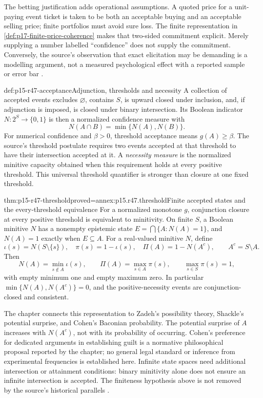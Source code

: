The betting justification adds operational assumptions. A quoted price for
a unit-paying event ticket is taken to be both an acceptable buying and an
acceptable selling price; finite portfolios must avoid sure loss. The finite
representation in \cref{def:p17-finite-price-coherence} makes that
two-sided commitment explicit. Merely supplying a number labelled
``confidence'' does not supply the commitment. Conversely, the source's
observation that exact elicitation may be demanding is a modelling argument,
not a measured psychological effect with a reported sample or error bar
\cite[p.~306]{DuboisPrade2021RepresentingBelief}.

\begin{hbdefinition}{def:p15-r47-acceptance}{Adjunction, thresholds and necessity}
A collection of accepted events excludes \(\varnothing\), contains \(S\),
is upward closed under inclusion, and, if adjunction is imposed, is closed
under binary intersection. Its Boolean indicator \(N:2^S\to\{0,1\}\)
is then a normalized confidence measure with
\[
 N(A\cap B)=\min\{N(A),N(B)\}.
\]
For numerical confidence and \(\beta>0\), threshold acceptance means
\(g(A)\geq\beta\). The source's threshold postulate requires two events
accepted at that threshold to have their intersection accepted at it.
A \emph{necessity measure} is the normalized minitive capacity obtained
when this requirement holds at every positive threshold. This universal
threshold quantifier is stronger than closure at one fixed threshold.
\end{hbdefinition}

\begin{hbtheorem}{thm:p15-r47-threshold}{proved=annex:p15.r47.threshold}{Finite accepted states and the every-threshold equivalence}
For a normalized monotone \(g\), conjunction closure at every positive
threshold is equivalent to minitivity. On finite \(S\), a Boolean minitive
\(N\) has a nonempty epistemic state
\(E=\bigcap\{A:N(A)=1\}\), and \(N(A)=1\) exactly when \(E\subseteq A\).
For a real-valued minitive \(N\), define
\[
 \iota(s)=N(S\setminus\{s\}),\quad \pi(s)=1-\iota(s),\quad
 \Pi(A)=1-N(A^c),\qquad A^c=S\setminus A.
\]
Then
\[
 N(A)=\min_{s\notin A}\iota(s),\qquad
 \Pi(A)=\max_{s\in A}\pi(s),\qquad \max_{s\in S}\pi(s)=1,
\]
with empty minimum one and empty maximum zero. In particular
\(\min\{N(A),N(A^c)\}=0\), and the positive-necessity events are
conjunction-closed and consistent.
\end{hbtheorem}

The chapter connects this representation to Zadeh's possibility theory,
Shackle's potential surprise, and Cohen's Baconian probability. The potential
surprise of \(A\) increases with \(N(A^c)\), not with its probability of
occurring. Cohen's preference for dedicated arguments in establishing guilt
is a normative philosophical proposal reported by the chapter; no general
legal standard or inference from experimental frequencies is established
here. Infinite state spaces need additional intersection or attainment
conditions: binary minitivity alone does not ensure an infinite intersection
is accepted. The finiteness hypothesis above is not removed by the source's
historical parallels \cite[p.~307 and note~4]{DuboisPrade2021RepresentingBelief}.

